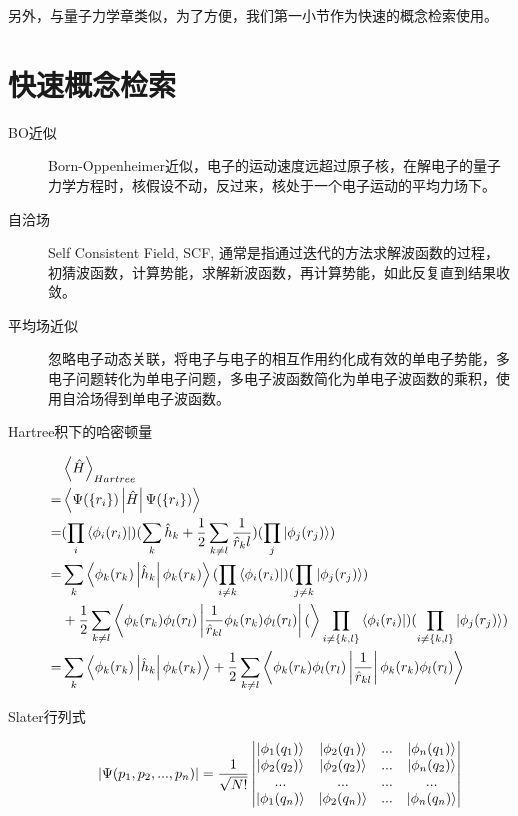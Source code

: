 \documentclass[12pt,a4paper,openany,twoside]{book}
\numberwithin{equation}{section}
\newcommand{\bracketl}[3]{\left\langle #1 \left| #2 \right| #3 \right\rangle}
\newcommand{\mean}[1]{\left\langle #1 \right\rangle}
\begin{document}
      另外，与量子力学章类似，为了方便，我们第一小节作为快速的概念检索使用。

      \section{快速概念检索}
        \begin{description}
          \item[BO近似] Born-Oppenheimer近似，电子的运动速度远超过原子核，在解电子的量子力学方程时，核假设不动，反过来，核处于一个电子运动的平均力场下。
          
          \item[自洽场] Self Consistent Field, SCF, 通常是指通过迭代的方法求解波函数的过程，初猜波函数，计算势能，求解新波函数，再计算势能，如此反复直到结果收敛。
          
          \item[平均场近似] 忽略电子动态关联，将电子与电子的相互作用约化成有效的单电子势能，多电子问题转化为单电子问题，多电子波函数简化为单电子波函数的乘积，使用自洽场得到单电子波函数。
          
          \item[Hartree积下的哈密顿量] 
            \begin{align*}
              &\mean{\hat{H}}_{Hartree} \\
              =& \bracketl{\Psi(\{r_i\})}{\hat{H}}{\Psi(\{r_i\})}\\
              =&(\prod_i\bra{\phi_i(r_i)})(\sum_k\hat{h}_k+\frac{1}{2}\sum_{k\neq l}\frac{1}{\hat{r}_kl})(\prod_j\ket{\phi_j(r_j)})\\
              =&\sum_k\bracketl{\phi_k(r_k)}{\hat{h}_k}{\phi_k(r_k)}(\prod_{i\neq k}\bra{\phi_i(r_i)})(\prod_{j \neq k}\ket{\phi_j(r_j)})\\
              &+\frac{1}{2}\sum_{k \neq l}\bracketl{\phi_k(r_k)\phi_l(r_l)}{\frac{1}{\hat{r}_{kl}}\phi_k(r_k)\phi_l(r_l)}(\prod_{i \neq \{k,l\}}\bra{\phi_i(r_i)})(\prod_{i \neq \{k,l\}}\ket{\phi_j(r_j)})\\
              =&\sum_k\bracketl{\phi_k(r_k)}{\hat{h}_k}{\phi_k(r_k)}+\frac{1}{2}\sum_{k \neq l}\bracketl{\phi_k(r_k)\phi_l(r_l)}{\frac{1}{\hat{r}_{kl}}}{\phi_k(r_k)\phi_l(r_l)}
            \end{align*} 

          \item[Slater行列式]
            \begin{equation}
              |\Psi(p_1,p_2,...,p_n)|=\frac{1}{\sqrt{N!}}
              \begin{vmatrix}
                \ket{\phi_1(q_1)} & \ket{\phi_2(q_1)} & ... & \ket{\phi_n(q_1)}\\
                \ket{\phi_2(q_2)} & \ket{\phi_2(q_2)} & ... & \ket{\phi_n(q_2)}\\
                ... & ...& ... & ...\\
                \ket{\phi_1(q_n)} & \ket{\phi_2(q_n)} & ... & \ket{\phi_n(q_n)}\\
              \end{vmatrix}
            \end{equation}
      

\end{description}
\end{document}
